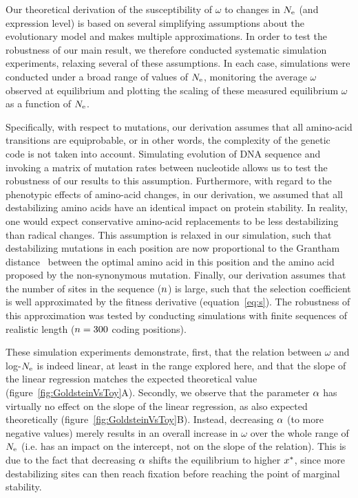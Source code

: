 Our theoretical derivation of the susceptibility of $\omega$ to changes in $N_{\text{e}}$ (and expression level) is based on several simplifying assumptions about the evolutionary model and makes multiple approximations.
In order to test the robustness of our main result, we therefore conducted systematic simulation experiments, relaxing several of these assumptions.
In each case, simulations were conducted under a broad range of values of $N_{\text{e}}$, monitoring the average $\omega$ observed at equilibrium and plotting the scaling of these measured equilibrium $\omega$ as a function of $N_{\text{e}}$.

Specifically, with respect to mutations, our derivation assumes that all amino-acid transitions are equiprobable, or in other words, the complexity of the genetic code is not taken into account.
Simulating evolution of \acrshort{DNA} sequence and invoking a matrix of mutation rates between nucleotide allows us to test the robustness of our results to this assumption.
Furthermore, with regard to the phenotypic effects of amino-acid changes, in our derivation, we assumed that all destabilizing amino acids have an identical impact on protein stability.
In reality, one would expect conservative amino-acid replacements to be less destabilizing than radical changes.
This assumption is relaxed in our simulation, such that destabilizing mutations in each position are now proportional to the Grantham distance~\citep{Grantham1974} between the optimal amino acid in this position and the amino acid proposed by the non-synonymous mutation.
Finally, our derivation assumes that the number of sites in the sequence ($n$) is large, such that the selection coefficient is well approximated by the fitness derivative (equation~\ref{eq:s}).
The robustness of this approximation was tested by conducting simulations with finite sequences of realistic length ($n=300$ coding positions).

These simulation experiments demonstrate, first, that the relation between $\omega$ and log-$N_{\text{e}}$ is indeed linear, at least in the range explored here, and that the slope of the linear regression matches the expected theoretical value (figure~\ref{fig:GoldsteinVsToy}A).
Secondly, we observe that the parameter $\alpha$ has virtually no effect on the slope of the linear regression, as also expected theoretically (figure~\ref{fig:GoldsteinVsToy}B).
Instead, decreasing $\alpha$ (to more negative values) merely results in an overall increase in $\omega$ over the whole range of $N_{\text{e}}$ (i.e. has an impact on the intercept, not on the slope of the relation).
This is due to the fact that decreasing $\alpha$ shifts the equilibrium to higher $x^{*}$, since more destabilizing sites can then reach fixation before reaching the point of marginal stability.

